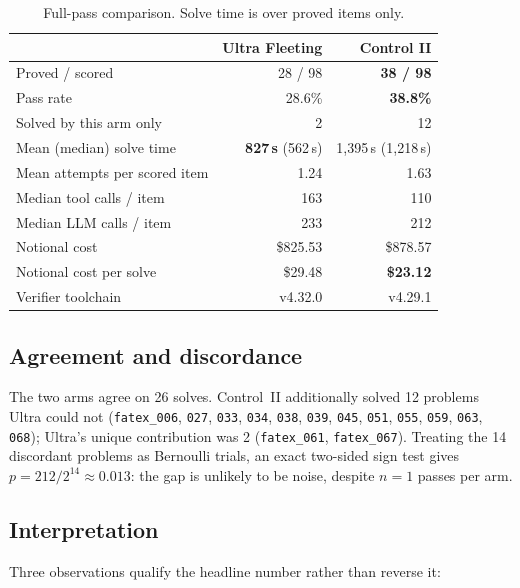 \documentclass[12pt, a4paper]{article}
\newcommand{\run}[1]{\texttt{#1}}
\begin{document}
\begin{table}[H]
\centering\small
\caption{Full-pass comparison. Solve time is over proved items only.}
\label{tab:headtohead}
\begin{tabular}{@{}lrr@{}}
\toprule
 & Ultra Fleeting & Control II \\
\midrule
Proved / scored          & 28 / 98 & \textbf{38 / 98} \\
Pass rate                & 28.6\% & \textbf{38.8\%} \\
Solved by this arm only  & 2 & 12 \\
Mean (median) solve time & \textbf{827\,s} (562\,s) & 1{,}395\,s (1{,}218\,s) \\
Mean attempts per scored item & 1.24 & 1.63 \\
Median tool calls / item      & 163 & 110 \\
Median LLM calls / item       & 233 & 212 \\
Notional cost                 & \$825.53 & \$878.57 \\
Notional cost per solve       & \$29.48 & \textbf{\$23.12} \\
Verifier toolchain            & v4.32.0 & v4.29.1 \\
\bottomrule
\end{tabular}
\end{table}

\subsection{Agreement and discordance}

The two arms agree on 26 solves. Control~II additionally solved 12 problems
Ultra could not (\run{fatex\_006}, \run{027}, \run{033}, \run{034},
\run{038}, \run{039}, \run{045}, \run{051}, \run{055}, \run{059}, \run{063},
\run{068}); Ultra's unique contribution was 2 (\run{fatex\_061},
\run{fatex\_067}). Treating the 14 discordant problems as Bernoulli trials, an
exact two-sided sign test gives $p = 212/2^{14} \approx 0.013$: the gap is
unlikely to be noise, despite $n=1$ passes per arm.

\subsection{Interpretation}

Three observations qualify the headline number rather than reverse it:
\end{document}
